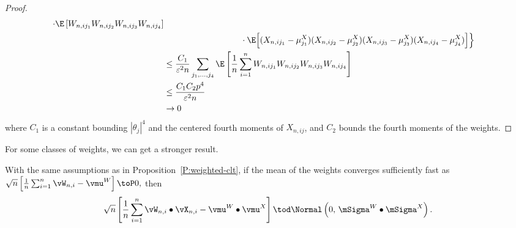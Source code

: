 \begin{proof}
\begin{align*}
                 \cdot \E \left[ 
                         W_{n,ij_1}
                         W_{n,ij_2}
                         W_{n,ij_3}
                         W_{n,ij_4}
                     \right] \\
                &\qquad\qquad\qquad\qquad\quad \cdot \E \Big[ 
                        (X_{n,ij_1} - \mu^X_{j_1})
                        (X_{n,ij_2} - \mu^X_{j_2})
                        (X_{n,ij_3} - \mu^X_{j_3})
                        (X_{n,ij_4} - \mu^X_{j_4})
                    \Big] \Big\} \\
        &\leq
            \frac{C_1}{\varepsilon^2 n}
            \sum_{j_1, \ldots, j_4}
                \E \left[
                    \frac{1}{n}
                    \sum_{i=1}^n
                        W_{n,ij_1}
                        W_{n,ij_2}
                        W_{n,ij_3}
                        W_{n,ij_4}
                \right] \\
        &\leq
            \frac{C_1 C_2 p^4}{\varepsilon^2 n} \\
        &\to 0
    \end{align*}
    where $C_1$ is a constant bounding $|\theta_{j}|^4$ and the
    centered fourth moments of $X_{n,ij}$, and $C_2$ bounds the
    fourth moments of the weights.
\end{proof}

For some classes of weights, we can get a stronger result.

\begin{corollary}\label{C:strong-weighted-clt}
    With the same assumptions as in Proposition~\ref{P:weighted-clt},
    if the mean of the weights converges sufficiently fast as
    \(
        \sqrt{n} \left[ \frac{1}{n} \sum_{i=1}^n \vW_{n,i} - \vmu^W \right] 
        \toP 
        0,
    \)
    then
    \[
        \sqrt{n}
        \left[
            \frac{1}{n}
            \sum_{i=1}^n
                \vW_{n,i} \bullet \vX_{n,i}
            -
            \vmu^W \bullet \vmu^X
        \right]
        \tod
        \Normal\left( 0, \, \mSigma^W \bullet \mSigma^X \right).
    \]
\end{corollary}
